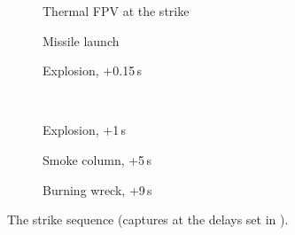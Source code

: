 \begin{figure}[h]
  \centering
  \begin{subfigure}{0.325\linewidth}\caption{Thermal FPV at the strike}\end{subfigure}
  \begin{subfigure}{0.325\linewidth}\caption{Missile launch}\end{subfigure}
  \begin{subfigure}{0.325\linewidth}\caption{Explosion, +0.15\,s}\end{subfigure}\\[1mm]
  \begin{subfigure}{0.325\linewidth}\caption{Explosion, +1\,s}\end{subfigure}
  \begin{subfigure}{0.325\linewidth}\caption{Smoke column, +5\,s}\end{subfigure}
  \begin{subfigure}{0.325\linewidth}\caption{Burning wreck, +9\,s}\end{subfigure}
  \caption{The strike sequence (captures at the delays set in ).}
  \label{fig:strike}
\end{figure}

